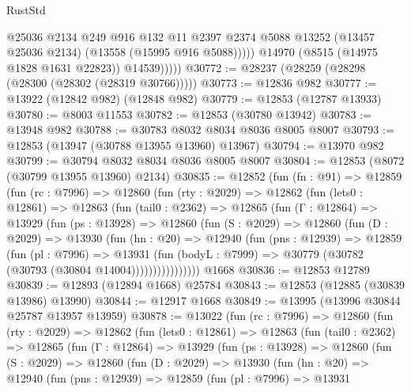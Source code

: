 \begin{lexlean}{RustStd}
\begin{coremodule}
                    @25036
                    @2134
                    @249
                    @916
                    @132
                    @11
                    @2397
                    @2374
                    @5088
                    @13252
                    (@13457 @25036 @2134)
                    (@13558 (@15995 @916 @5088)))))
              @14970
              (@8515 (@14975 @1828 @1631 @22823))
              @14539)))))
@30772 := @28237 (@28259 (@28298 (@28300 (@28302 (@28319 @30766)))))
@30773 := @12836 @982
@30777 := @13922 (@12842 @982) (@12848 @982)
@30779 := @12853 (@12787 @13933)
@30780 := @8003 @11553
@30782 := @12853 (@30780 @13942)
@30783 := @13948 @982
@30788 := @30783 @8032 @8034 @8036 @8005 @8007
@30793 := @12853 (@13947 (@30788 @13955 @13960) @13967)
@30794 := @13970 @982
@30799 := @30794 @8032 @8034 @8036 @8005 @8007
@30804 := @12853 (@8072 (@30799 @13955 @13960) @2134)
@30835 := @12852
    (fun (fn : @91) =>
    @12859
      (fun (rc : @7996) =>
      @12860
        (fun (rty : @2029) =>
        @12862
          (fun (lets0 : @12861) =>
          @12863
            (fun (tail0 : @2362) =>
            @12865
              (fun (Γ : @12864) =>
              @13929
                (fun (ps : @13928) =>
                @12860
                  (fun (S : @2029) =>
                  @12860
                    (fun (D : @2029) =>
                    @13930
                      (fun (hn : @20) =>
                      @12940
                        (fun (pns : @12939) =>
                        @12859
                          (fun (pl : @7996) =>
                          @13931
                            (fun (bodyL : @7999) =>
                            @30779 (@30782 (@30793 (@30804 @14004))))))))))))))))
    @1668
@30836 := @12853 @12789
@30839 := @12893 (@12894 @1668) @25784
@30843 := @12853 (@12885 (@30839 @13986) @13990)
@30844 := @12917 @1668
@30849 := @13995 (@13996 @30844 @25787 @13957 @13959)
@30878 := @13022
    (fun (rc : @7996) =>
    @12860
      (fun (rty : @2029) =>
      @12862
        (fun (lets0 : @12861) =>
        @12863
          (fun (tail0 : @2362) =>
          @12865
            (fun (Γ : @12864) =>
            @13929
              (fun (ps : @13928) =>
              @12860
                (fun (S : @2029) =>
                @12860
                  (fun (D : @2029) =>
                  @13930
                    (fun (hn : @20) =>
                    @12940
                      (fun (pns : @12939) =>
                      @12859
                        (fun (pl : @7996) =>
                        @13931

\end{coremodule}
\end{lexlean}
